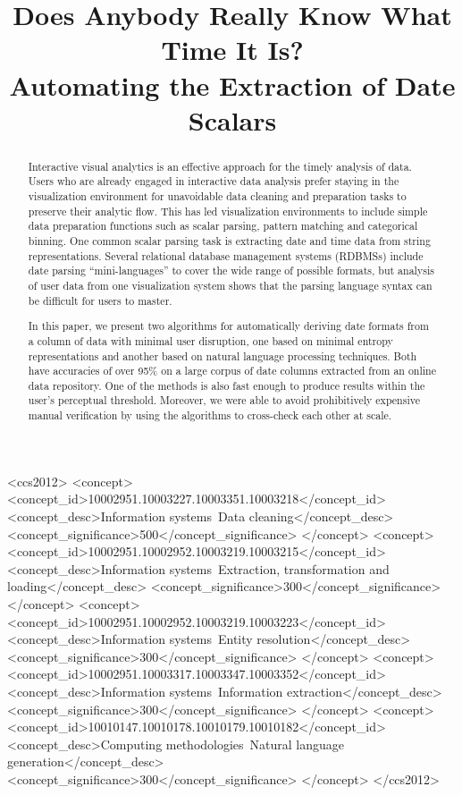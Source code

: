\documentclass{sig-alternate-05-2015}
\begin{document}
\title{Does Anybody Really Know What Time It Is?\\
Automating the Extraction of Date Scalars}


\maketitle

\begin{abstract}
Interactive visual analytics is an effective approach for the timely analysis of data. Users who are already engaged in interactive data analysis prefer staying in the visualization environment for unavoidable data cleaning and preparation tasks to preserve their analytic flow. This has led visualization environments to include simple data preparation functions such as scalar parsing, pattern matching and categorical binning. One common scalar parsing task is extracting date and time data from string representations. Several relational database management systems (RDBMSs) include date parsing ``mini-languages'' to cover the wide range of possible formats, but analysis of user data from one visualization system shows that the parsing language syntax can be difficult for users to master.

In this paper, we present two algorithms for automatically deriving date formats from a column of data with minimal user disruption, one based on minimal entropy representations and another based on natural language processing techniques. Both have accuracies of over 95\% on a large corpus of date columns extracted from an online data repository. One of the methods is also fast enough to produce results within the user's perceptual threshold. Moreover, we were able to avoid prohibitively expensive manual verification by using the algorithms to cross-check each other at scale.
\end{abstract}

%
%
\begin{CCSXML}
<ccs2012>
<concept>
<concept_id>10002951.10003227.10003351.10003218</concept_id>
<concept_desc>Information systems~Data cleaning</concept_desc>
<concept_significance>500</concept_significance>
</concept>
<concept>
<concept_id>10002951.10002952.10003219.10003215</concept_id>
<concept_desc>Information systems~Extraction, transformation and loading</concept_desc>
<concept_significance>300</concept_significance>
</concept>
<concept>
<concept_id>10002951.10002952.10003219.10003223</concept_id>
<concept_desc>Information systems~Entity resolution</concept_desc>
<concept_significance>300</concept_significance>
</concept>
<concept>
<concept_id>10002951.10003317.10003347.10003352</concept_id>
<concept_desc>Information systems~Information extraction</concept_desc>
<concept_significance>300</concept_significance>
</concept>
<concept>
<concept_id>10010147.10010178.10010179.10010182</concept_id>
<concept_desc>Computing methodologies~Natural language generation</concept_desc>
<concept_significance>300</concept_significance>
</concept>
</ccs2012>
\end{CCSXML}
\end{document}
